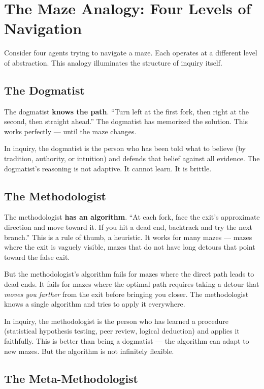 \documentclass[11pt,letterpaper]{article}
\begin{document}
\section{The Maze Analogy: Four Levels of Navigation}

Consider four agents trying to navigate a maze. Each operates at a different level of abstraction. This analogy illuminates the structure of inquiry itself.

\subsection*{The Dogmatist}

The dogmatist \textbf{knows the path}. ``Turn left at the first fork, then right at the second, then straight ahead.'' The dogmatist has memorized the solution. This works perfectly — until the maze changes.

In inquiry, the dogmatist is the person who has been told what to believe (by tradition, authority, or intuition) and defends that belief against all evidence. The dogmatist's reasoning is not adaptive. It cannot learn. It is brittle.

\subsection*{The Methodologist}

The methodologist \textbf{has an algorithm}. ``At each fork, face the exit's approximate direction and move toward it. If you hit a dead end, backtrack and try the next branch.'' This is a rule of thumb, a heuristic. It works for many mazes — mazes where the exit is vaguely visible, mazes that do not have long detours that point toward the false exit.

But the methodologist's algorithm fails for mazes where the direct path leads to dead ends. It fails for mazes where the optimal path requires taking a detour that \emph{moves you farther} from the exit before bringing you closer. The methodologist knows a single algorithm and tries to apply it everywhere.

In inquiry, the methodologist is the person who has learned a procedure (statistical hypothesis testing, peer review, logical deduction) and applies it faithfully. This is better than being a dogmatist — the algorithm can adapt to new mazes. But the algorithm is not infinitely flexible.

\subsection*{The Meta-Methodologist}
\end{document}
